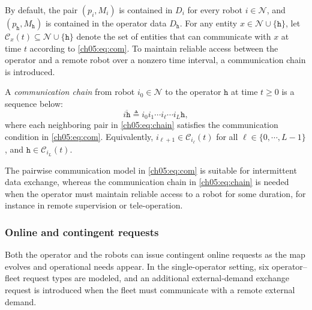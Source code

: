 By default, the pair $(p_i, M_i)$ is contained in $D_i$ for every robot
$i \in \mathcal{N}$, and $(p_{\texttt{h}}, M_{\texttt{h}})$ is contained in the
operator data $D_{\texttt{h}}$. For any entity
$x \in \mathcal{N} \cup \{\texttt{h}\}$, let
$\mathcal{C}_x(t) \subseteq \mathcal{N} \cup \{\texttt{h}\}$ denote the set of
entities that can communicate with $x$ at time $t$ according to
\eqref{ch05:eq:com}. To maintain reliable access between the operator and a
remote robot over a nonzero time interval, a communication chain is introduced.

\begin{definition}
A \emph{communication chain} from robot $i_0 \in \mathcal{N}$ to the operator
$\texttt{h}$ at time $t \geq 0$ is a sequence below:
\begin{equation}
\overline{i\texttt{h}} \triangleq i_0 i_1 \cdots i_\ell \cdots i_L \texttt{h},
\label{ch05:eq:chain}
\end{equation}
where each neighboring pair in \eqref{ch05:eq:chain} satisfies the
communication condition in \eqref{ch05:eq:com}. Equivalently,
$i_{\ell+1} \in \mathcal{C}_{i_\ell}(t)$ for all
$\ell \in \{0,\cdots,L-1\}$, and
$\texttt{h} \in \mathcal{C}_{i_L}(t)$.
\end{definition}

The pairwise communication model in \eqref{ch05:eq:com} is suitable for
intermittent data exchange, whereas the communication chain in
\eqref{ch05:eq:chain} is needed when the operator must maintain reliable access
to a robot for some duration, for instance in remote supervision or
tele-operation.

\subsubsection{Online and contingent requests}
\label{ch05:subsec:robot-human}

Both the operator and the robots can issue contingent online requests as the map
evolves and operational needs appear.
In the single-operator setting, six operator--fleet request types are modeled,
and an additional external-demand exchange request is introduced when the fleet
must communicate with a remote external demand.

